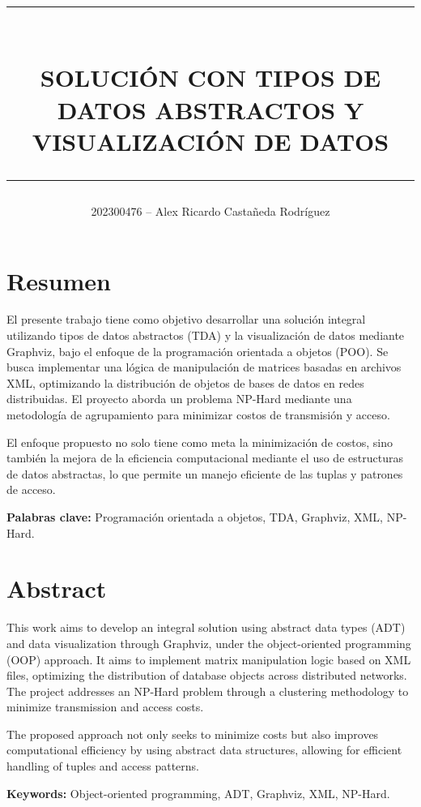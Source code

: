 \documentclass[letterpaper,12pt]{article}
\title{
    \rule{\textwidth}{0.4pt} \\
    \vspace{0.4cm}
    \textbf{SOLUCIÓN CON TIPOS DE DATOS ABSTRACTOS Y VISUALIZACIÓN DE DATOS} \\
    \rule{\textwidth}{0.4pt}
}
\author{202300476 – Alex Ricardo Castañeda Rodríguez}
\date{}
\begin{document}
\maketitle
\vspace{1cm}

\begin{multicols}{2}

    \section*{Resumen}
    El presente trabajo tiene como objetivo desarrollar una solución integral utilizando tipos de datos abstractos (TDA) y la visualización de datos mediante Graphviz, bajo el enfoque de la programación orientada a objetos (POO). Se busca implementar una lógica de manipulación de matrices basadas en archivos XML, optimizando la distribución de objetos de bases de datos en redes distribuidas. El proyecto aborda un problema NP-Hard mediante una metodología de agrupamiento para minimizar costos de transmisión y acceso.

    El enfoque propuesto no solo tiene como meta la minimización de costos, sino también la mejora de la eficiencia computacional mediante el uso de estructuras de datos abstractas, lo que permite un manejo eficiente de las tuplas y patrones de acceso.

    \textbf{Palabras clave:} Programación orientada a objetos, TDA, Graphviz, XML, NP-Hard.

    \section*{Abstract}
    This work aims to develop an integral solution using abstract data types (ADT) and data visualization through Graphviz, under the object-oriented programming (OOP) approach. It aims to implement matrix manipulation logic based on XML files, optimizing the distribution of database objects across distributed networks. The project addresses an NP-Hard problem through a clustering methodology to minimize transmission and access costs.

    The proposed approach not only seeks to minimize costs but also improves computational efficiency by using abstract data structures, allowing for efficient handling of tuples and access patterns.

    \textbf{Keywords:} Object-oriented programming, ADT, Graphviz, XML, NP-Hard.

    \newpage


\end{multicols}
\end{document}
